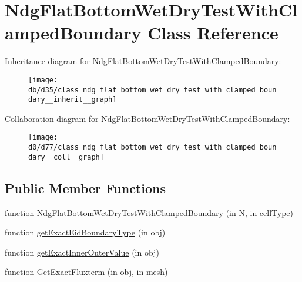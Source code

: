 \hypertarget{class_ndg_flat_bottom_wet_dry_test_with_clamped_boundary}{}\section{Ndg\+Flat\+Bottom\+Wet\+Dry\+Test\+With\+Clamped\+Boundary Class Reference}
\label{class_ndg_flat_bottom_wet_dry_test_with_clamped_boundary}


Inheritance diagram for Ndg\+Flat\+Bottom\+Wet\+Dry\+Test\+With\+Clamped\+Boundary\+:
\nopagebreak
\begin{figure}[H]
\begin{center}
\leavevmode
\texttt{[image: db/d35/class\_ndg\_flat\_bottom\_wet\_dry\_test\_with\_clamped\_boundary\_\_inherit\_\_graph]}
\end{center}
\end{figure}


Collaboration diagram for Ndg\+Flat\+Bottom\+Wet\+Dry\+Test\+With\+Clamped\+Boundary\+:
\nopagebreak
\begin{figure}[H]
\begin{center}
\leavevmode
\texttt{[image: d0/d77/class\_ndg\_flat\_bottom\_wet\_dry\_test\_with\_clamped\_boundary\_\_coll\_\_graph]}
\end{center}
\end{figure}
\subsection*{Public Member Functions}
\begin{DoxyCompactItemize}
\item 
function \hyperlink{class_ndg_flat_bottom_wet_dry_test_with_clamped_boundary_a060da115b0e58ffa5877c6c378b7f8df}{Ndg\+Flat\+Bottom\+Wet\+Dry\+Test\+With\+Clamped\+Boundary} (in N, in cell\+Type)
\item 
function \hyperlink{class_ndg_flat_bottom_wet_dry_test_with_clamped_boundary_aa4df3f05e8a56bf0072d4ea7ae4ff137}{get\+Exact\+Eid\+Boundary\+Type} (in obj)
\item 
function \hyperlink{class_ndg_flat_bottom_wet_dry_test_with_clamped_boundary_a40e0d5f2a267765021ed276eace53657}{get\+Exact\+Inner\+Outer\+Value} (in obj)
\item 
function \hyperlink{class_ndg_flat_bottom_wet_dry_test_with_clamped_boundary_aaada5bd67545e1fff265e03c3ad65136}{Get\+Exact\+Fluxterm} (in obj, in mesh)
\end{DoxyCompactItemize}

